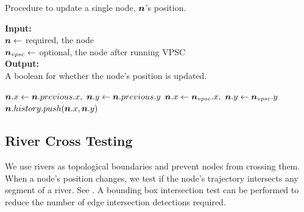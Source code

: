 \begin{algorithm}[tb!]
    \caption{Procedure to update a single node, $ \bm{n} $'s position.}\label{alg:move position}

    \textbf{Input:} \\
    $ \bm{n} \gets $ required, the node \\
    $ \bm{n}_{vpsc} \gets $ optional, the node after running VPSC \\

    \textbf{Output:} \\
    A boolean for whether the node's position is updated. \\

    \begin{algorithmic}[1]
            \item[] 
            \State {}
        \EndIf

        \item[] 
        \item[] 
            \State $ \bm{n}.x \gets \bm{n}.previous.x,~\bm{n}.y \gets \bm{n}.previous.y $
        \Else
            \State $ \bm{n}.x \gets \bm{n}_{vpsc}.x,~\bm{n}.y \gets \bm{n}_{vpsc}.y $
            \State $ \bm{n}.history.push(\bm{n}.x, \bm{n}.y) $
        \EndIf
        \State {}
        \EndProcedure
    \end{algorithmic}
\end{algorithm}


\subsection{River Cross Testing}

We use rivers as topological boundaries and prevent nodes from crossing them. When a node's position changes, we test if the node's trajectory intersects any segment of a river. See . A bounding box intersection test can be performed to reduce the number of edge intersection detections required.

